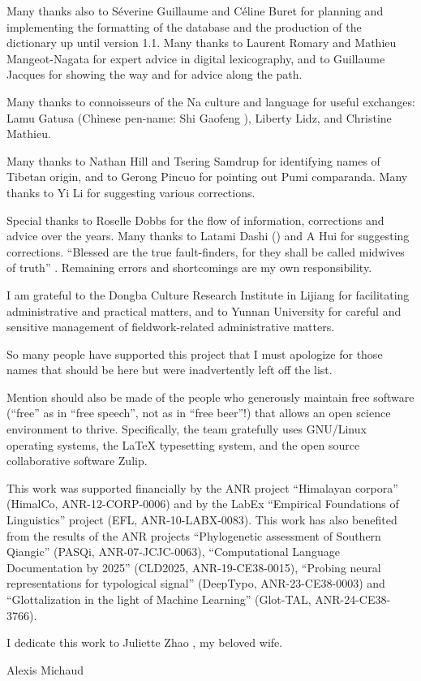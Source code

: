 Many thanks also to Séverine Guillaume and Céline Buret for planning and implementing the formatting of the database and the production of the dictionary up until version 1.1. Many thanks to Laurent Romary and Mathieu Mangeot-Nagata for expert advice in digital lexicography, and to Guillaume Jacques for showing the way and for advice along the path.

Many thanks to connoisseurs of the Na culture and language for useful exchanges: Lamu Gatusa  (Chinese pen-name: Shi Gaofeng ), Liberty Lidz, and Christine Mathieu.

Many thanks to Nathan Hill and Tsering Samdrup for identifying names of Tibetan origin, and to Gerong Pincuo  for pointing out Pumi comparanda. Many thanks to Yi Li  for suggesting various corrections.

Special thanks to Roselle Dobbs for the flow of information, corrections and advice over the years. Many thanks to Latami Dashi  () and A Hui  for suggesting corrections. ``Blessed are the true fault-finders, for they shall be called midwives of truth'' \parencite[vi]{yliniemi_descriptive_2022}. Remaining errors and shortcomings are my own responsibility.

I am grateful to the Dongba Culture Research Institute  in Lijiang for facilitating administrative and practical matters, and to Yunnan University for careful and sensitive management of fieldwork-related administrative matters.

So many people have supported this project that I must apologize for those names that should be here but were inadvertently left off the list.

Mention should also be made of the people who generously maintain free software (“free” as in “free speech”, not as in “free beer”!) that allows an open science environment to thrive. Specifically, the team gratefully uses GNU/Linux operating systems, the \LaTeX{} typesetting system, and the open source collaborative software Zulip.

This work was supported financially by the ANR project  “Himalayan corpora” (HimalCo, ANR-12-CORP-0006) and by the LabEx “Empirical Foundations of Linguistics” project (EFL, ANR-10-LABX-0083). This work has also benefited from the results of the ANR projects “Phylogenetic assessment of Southern Qiangic” (PASQi, ANR-07-JCJC-0063), “Computational Language Documentation by 2025” (CLD2025, ANR-19-CE38-0015), “Probing neural representations for typological signal” (DeepTypo, ANR-23-CE38-0003) and “Glottalization in the light of Machine Learning” (Glot-TAL, ANR-24-CE38-3766).

I dedicate this work to Juliette Zhao , my beloved wife.

{\raggedleft Alexis Michaud\par}
